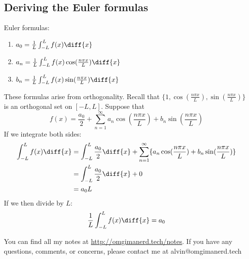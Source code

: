 \documentclass{math}
\begin{document}
\subsection*{Deriving the Euler formulas}
Euler formulas:
\begin{enumerate}
  \item \( a_0 = \frac{1}{L}\int_{-L}^{L}f(x)\diff{x} \)
  \item \( a_n = \frac{1}{L}\int_{-L}^{L}f(x)\cos(\frac{n\pi x}{L})\diff{x} \)
  \item \( b_n = \frac{1}{L}\int_{-L}^{L}f(x)\sin(\frac{n\pi x}{L})\diff{x} \)
\end{enumerate}
These formulas arise from orthogonality. Recall that \( \{1,
\cos(\frac{n\pi x}{L}),\sin(\frac{n\pi x}{L}) \} \) is an orthogonal set on
\( [-L,L] \). Suppose that
\[ f(x) = \frac{a_0}{2}+\sum_{n=1}^{\infty}a_n\cos(\frac{n\pi x}{L})+
  b_n\sin(\frac{n\pi x}{L}) \]
If we integrate both sides:
\begin{align*}
  \int_{-L}^{L}f(x)\diff{x} &= \int_{-L}^{L}\frac{a_0}{2}\diff{x}+
    \sum_{n=1}^{\infty}\{a_n\cos(\frac{n\pi x}{L})+
    b_n\sin(\frac{n\pi x}{L})\} \\
  &= \int_{-L}^{L}\frac{a_0}{2}\diff{x}+0 \\
  &= a_0L
\end{align*}
If we then divide by \( L \):
\[ \frac{1}{L}\int_{-L}^{L}f(x)\diff{x} = a_0 \]

\begin{center}
  You can find all my notes at \url{http://omgimanerd.tech/notes}. If you have
  any questions, comments, or concerns, please contact me at
  alvin@omgimanerd.tech
\end{center}
\end{document}
